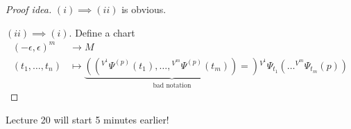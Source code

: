 \begin{proof}[Proof idea]
    \((i)\implies (ii)\) is obvious.

    \((ii)\implies (i)\). Define a chart \begin{align*}
        (-\epsilon,\epsilon)^m&\to M\\
        (t_1,\dots,t_n)&\mapsto\underbrace{\left(\left({}^{V^1}\Psi^{(p)}(t_1),\dots,{}^{V^m}\Psi^{(p)}(t_m)\right)=\right)}_{\text{bad notation}}{}^{V^1}\Psi_{t_1}\left(\dots {}^{V^m}\Psi_{t_m}(p)\right) 
    \end{align*}
\end{proof}

\begin{remark}
    Lecture 20 will start 5 minutes earlier!
\end{remark}

